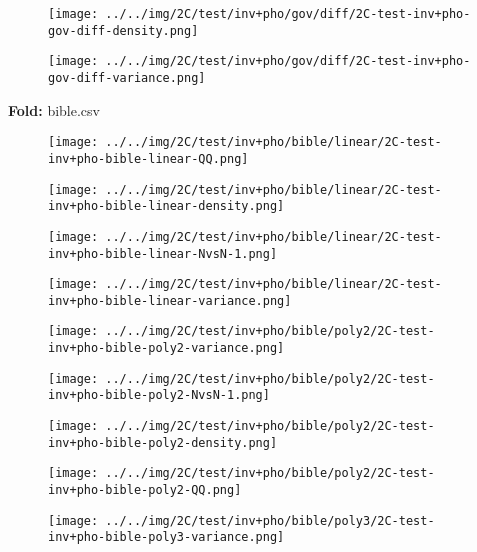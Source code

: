 \begin{figure}[H]
\centering	\texttt{[image: ../../img/2C/test/inv+pho/gov/diff/2C-test-inv+pho-gov-diff-density.png]}
\end{figure}
\begin{figure}[H]
\centering	\texttt{[image: ../../img/2C/test/inv+pho/gov/diff/2C-test-inv+pho-gov-diff-variance.png]}
\end{figure}
\textbf{Fold:} bible.csv
\begin{figure}[H]
\centering	\texttt{[image: ../../img/2C/test/inv+pho/bible/linear/2C-test-inv+pho-bible-linear-QQ.png]}
\end{figure}
\begin{figure}[H]
\centering	\texttt{[image: ../../img/2C/test/inv+pho/bible/linear/2C-test-inv+pho-bible-linear-density.png]}
\end{figure}
\begin{figure}[H]
\centering	\texttt{[image: ../../img/2C/test/inv+pho/bible/linear/2C-test-inv+pho-bible-linear-NvsN-1.png]}
\end{figure}
\begin{figure}[H]
\centering	\texttt{[image: ../../img/2C/test/inv+pho/bible/linear/2C-test-inv+pho-bible-linear-variance.png]}
\end{figure}
\begin{figure}[H]
\centering	\texttt{[image: ../../img/2C/test/inv+pho/bible/poly2/2C-test-inv+pho-bible-poly2-variance.png]}
\end{figure}
\begin{figure}[H]
\centering	\texttt{[image: ../../img/2C/test/inv+pho/bible/poly2/2C-test-inv+pho-bible-poly2-NvsN-1.png]}
\end{figure}
\begin{figure}[H]
\centering	\texttt{[image: ../../img/2C/test/inv+pho/bible/poly2/2C-test-inv+pho-bible-poly2-density.png]}
\end{figure}
\begin{figure}[H]
\centering	\texttt{[image: ../../img/2C/test/inv+pho/bible/poly2/2C-test-inv+pho-bible-poly2-QQ.png]}
\end{figure}
\begin{figure}[H]
\centering	\texttt{[image: ../../img/2C/test/inv+pho/bible/poly3/2C-test-inv+pho-bible-poly3-variance.png]}
\end{figure}
